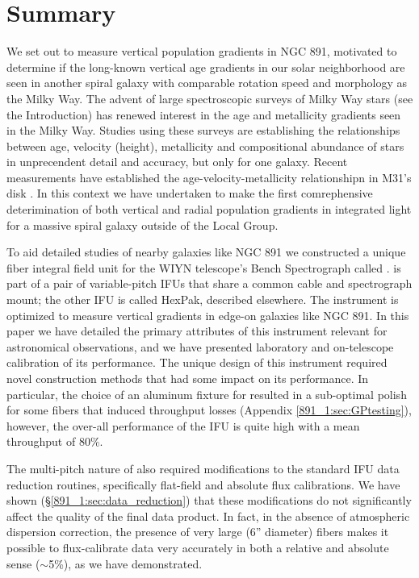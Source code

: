 \section{Summary}
\label{891_1:sec:summary}

We set out to measure vertical population gradients in NGC 891,
motivated to determine if the long-known vertical age gradients in our
solar neighborhood are seen in another spiral galaxy with comparable
rotation speed and morphology as the Milky Way.  The advent of large
spectroscopic surveys of Milky Way stars (see the Introduction) has
renewed interest in the age and metallicity gradients seen in the
Milky Way. Studies using these surveys
\citep[e.g.,][]{Bovy12c,Hayden14,Hayden15} are establishing the
relationships between age, velocity (height), metallicity and
compositional abundance of stars in unprecendent detail and accuracy,
but only for one galaxy.  Recent measurements have established the
age-velocity-metallicity relationshipn in M31's disk
\citep{Dorman15}. In this context we have undertaken to make the first
comrephensive deterimination of both vertical and radial population
gradients in integrated light for a massive spiral galaxy outside of
the Local Group.

To aid detailed studies of nearby galaxies like NGC 891 we constructed
a unique fiber integral field unit for the WIYN telescope's Bench
Spectrograph called \GP. \GP is part of a pair of variable-pitch IFUs
that share a common cable and spectrograph mount; the other IFU is
called HexPak, described elsewhere.  The \GP instrument is optimized
to measure vertical gradients in edge-on galaxies like NGC 891. In
this paper we have detailed the primary attributes of this instrument
relevant for astronomical observations, and we have presented
laboratory and on-telescope calibration of its performance.  The
unique design of this instrument required novel construction methods
that had some impact on its performance. In particular, the choice of
an aluminum fixture for \GP resulted in a sub-optimal polish for some
fibers that induced throughput losses (Appendix \ref{891_1:sec:GPtesting}),
however, the over-all performance of the IFU is quite high with a mean
throughput of 80\%.

The multi-pitch nature of \GP also required modifications to the
standard IFU data reduction routines, specifically flat-field and
absolute flux calibrations. We have shown (\S\ref{891_1:sec:data_reduction})
that these modifications do not significantly affect the quality of
the final data product. In fact, in the absence of atmospheric
dispersion correction, the presence of very large (6'' diameter)
fibers makes it possible to flux-calibrate \GP data very accurately in
both a relative and absolute sense ($\sim$5\%), as we have
demonstrated.

